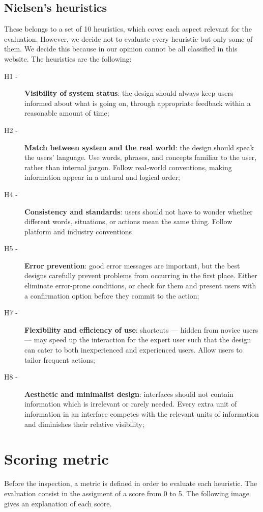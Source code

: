 \subsection{Nielsen's heuristics}
These belongs to a set of 10 heuristics, which cover each aspect relevant for the evaluation. However, we decide not to evaluate every heuristic but only some of them. We decide this because in our opinion cannot be all classified in this website.
The heuristics are the following:
\begin{description} 
\item[H1 -] \textbf{Visibility of system status}: the design should always keep users informed about what is going on, through appropriate feedback within a reasonable amount of time;
\item[H2 -] \textbf{Match between system and the real world}: the design should speak the users' language. Use words, phrases, and concepts familiar to the user, rather than internal jargon. Follow real-world conventions, making information appear in a natural and logical order;
\item[H4 -] \textbf{Consistency and standards}: users should not have to wonder whether different words, situations, or actions mean the same thing. Follow platform and industry conventions
\item[H5 -] \textbf{Error prevention}: good error messages are important, but the best designs carefully prevent problems from occurring in the first place. Either eliminate error-prone conditions, or check for them and present users with a confirmation option before they commit to the action;
\item[H7 -] \textbf{Flexibility and efficiency of use}: shortcuts — hidden from novice users — may speed up the interaction for the expert user such that the design can cater to both inexperienced and experienced users. Allow users to tailor frequent actions;
\item[H8 -] \textbf{Aesthetic and minimalist design}: interfaces should not contain information which is irrelevant or rarely needed. Every extra unit of information in an interface competes with the relevant units of information and diminishes their relative visibility;
\end{description}


\section{Scoring metric}
Before the inspection, a metric is defined in order to evaluate each heuristic. The evaluation consist in the assigment of a score from 0 to 5. The following image gives an explanation of each score.

